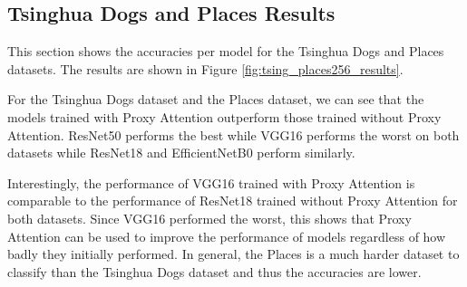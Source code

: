 \documentclass[a4paper,11pt,openright]{book}
\begin{document}
\subsection{Tsinghua Dogs and Places Results}
This section shows the accuracies per model for the Tsinghua Dogs \cite{zouNewDatasetDog2020} and Places \cite{zhouPlaces10Million2018} datasets. The results are shown in Figure \ref{fig:tsing_places256_results}.

For the Tsinghua Dogs dataset and the Places dataset, we can see that the models trained with Proxy Attention outperform those trained without Proxy Attention. 
ResNet50 \cite{heDeepResidualLearning2016} performs the best while VGG16 \cite{simonyanVeryDeepConvolutional2014} performs the worst on both datasets while ResNet18 and EfficientNetB0 perform similarly. 

Interestingly, the performance of VGG16 trained with Proxy Attention is comparable to the performance of ResNet18 trained without Proxy Attention for both datasets. Since VGG16 performed the worst, this shows that Proxy Attention can be used to improve the performance of models regardless of how badly they initially performed.
In general, the Places is a much harder dataset to classify than the Tsinghua Dogs dataset and thus the accuracies are lower.
\end{document}
